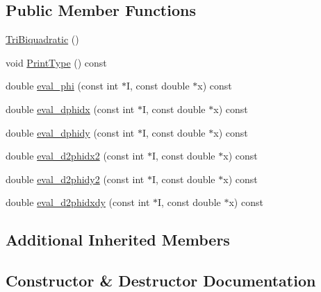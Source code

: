 \subsection*{Public Member Functions}
\begin{DoxyCompactItemize}
\item 
\mbox{\hyperlink{classfemus_1_1_tri_biquadratic_a29bdf5781d03196409b150abd01cae0c}{Tri\+Biquadratic}} ()
\item 
void \mbox{\hyperlink{classfemus_1_1_tri_biquadratic_aced862267b6234631f7a67f842d736f1}{Print\+Type}} () const
\item 
double \mbox{\hyperlink{classfemus_1_1_tri_biquadratic_a54c2fe960a81b80f297e8e7e74e95666}{eval\+\_\+phi}} (const int $\ast$I, const double $\ast$x) const
\item 
double \mbox{\hyperlink{classfemus_1_1_tri_biquadratic_a76b4223ec87d072fb08067629296c6dd}{eval\+\_\+dphidx}} (const int $\ast$I, const double $\ast$x) const
\item 
double \mbox{\hyperlink{classfemus_1_1_tri_biquadratic_a123e9959df919b986b96ee8fb172e632}{eval\+\_\+dphidy}} (const int $\ast$I, const double $\ast$x) const
\item 
double \mbox{\hyperlink{classfemus_1_1_tri_biquadratic_a671d38cd3a1c851e54d71e3a53c85039}{eval\+\_\+d2phidx2}} (const int $\ast$I, const double $\ast$x) const
\item 
double \mbox{\hyperlink{classfemus_1_1_tri_biquadratic_a74610251368c2a83d701532e7b1931ed}{eval\+\_\+d2phidy2}} (const int $\ast$I, const double $\ast$x) const
\item 
double \mbox{\hyperlink{classfemus_1_1_tri_biquadratic_add4c6b1cf71bc83b7d480337d5800808}{eval\+\_\+d2phidxdy}} (const int $\ast$I, const double $\ast$x) const
\end{DoxyCompactItemize}
\subsection*{Additional Inherited Members}


\subsection{Constructor \& Destructor Documentation}
\mbox{\label{classfemus_1_1_tri_biquadratic_a29bdf5781d03196409b150abd01cae0c}} 
